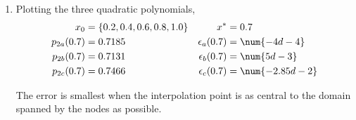 \begin{enumerate}
\begin{enumerate}
              \item Plotting the three quadratic polynomials,
                    \begin{align}
                        x_0             & = \{0.2, 0.4, 0.6, 0.8, 1.0\} &
                        x^*             & = 0.7                           \\
                        p_{2a}(0.7)     & = 0.7185                      &
                        \epsilon_a(0.7) & = \num{-4d-4}                   \\
                        p_{2b}(0.7)     & = 0.7131                      &
                        \epsilon_b(0.7) & = \num{5d-3}                    \\
                        p_{2c}(0.7)     & = 0.7466                      &
                        \epsilon_c(0.7) & = \num{-2.85d-2}
                    \end{align}
                    \begin{figure}[H]
                        \centering
                    \end{figure}
                    The error is smallest when the interpolation point is as central to
                    the domain spanned by the nodes as possible.


\end{enumerate}
\end{enumerate}

